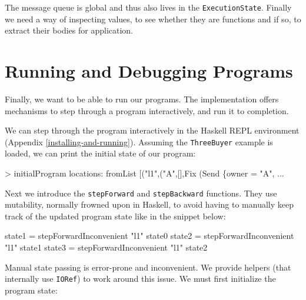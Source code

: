 \documentclass[runningheads,plain]{llncs}
\newenvironment{Shaded}{}{}
\newcommand{\DataTypeTok}[1]{\textcolor[rgb]{0.56,0.13,0.00}{#1}}
\newcommand{\StringTok}[1]{\textcolor[rgb]{0.25,0.44,0.63}{#1}}
\newcommand{\FunctionTok}[1]{\textcolor[rgb]{0.02,0.16,0.49}{#1}}
\newcommand{\NormalTok}[1]{#1}
\begin{document}
The message queue is global and thus also lives in the
\texttt{ExecutionState}. Finally we need a way of inspecting values, to
see whether they are functions and if so, to extract their bodies for
application.

\section{Running and Debugging Programs}\label{running-debugging}

Finally, we want to be able to run our programs. The implementation
offers mechanisms to step through a program interactively, and run it to
completion.

We can step through the program interactively in the Haskell REPL
environment (Appendix \ref{installing-and-running}). Assuming the
\texttt{ThreeBuyer} example is loaded, we can print the initial state of
our program:

\begin{Shaded}
\begin{Highlighting}[]
\FunctionTok{>}\NormalTok{ initialProgram}
\NormalTok{locations}\FunctionTok{:}\NormalTok{ fromList [(}\StringTok{"l1"}\NormalTok{,(}\StringTok{"A"}\NormalTok{,[],}\DataTypeTok{Fix}\NormalTok{ (}\DataTypeTok{Send}\NormalTok{ \{owner }\FunctionTok{=} \StringTok{"A"}\NormalTok{, }\FunctionTok{...} 
\end{Highlighting}
\end{Shaded}

Next we introduce the \texttt{stepForward} and \texttt{stepBackward}
functions. They use mutability, normally frowned upon in Haskell, to
avoid having to manually keep track of the updated program state like in
the snippet below:

\begin{Shaded}
\begin{Highlighting}[]
\NormalTok{state1 }\FunctionTok{=}\NormalTok{ stepForwardInconvenient }\StringTok{"l1"}\NormalTok{ state0}
\NormalTok{state2 }\FunctionTok{=}\NormalTok{ stepForwardInconvenient }\StringTok{"l1"}\NormalTok{ state1}
\NormalTok{state3 }\FunctionTok{=}\NormalTok{ stepForwardInconvenient }\StringTok{"l1"}\NormalTok{ state2}
\end{Highlighting}
\end{Shaded}

Manual state passing is error-prone and inconvenient. We provide helpers
(that internally use \texttt{IORef}) to work around this issue. We must
first initialize the program state:
\end{document}
